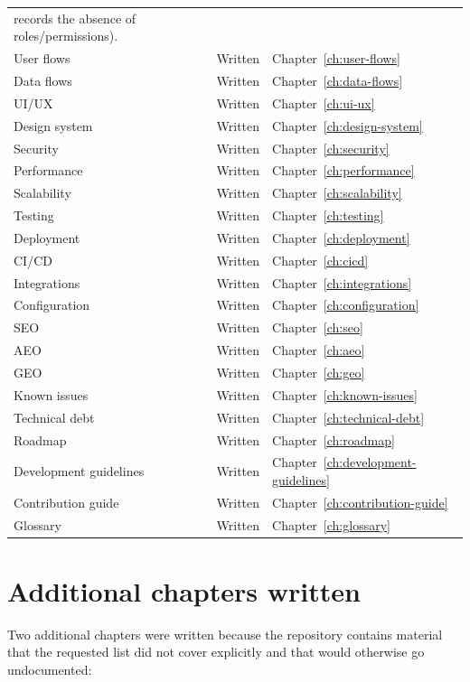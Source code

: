 \begin{longtable}{p{4.6cm}p{2.7cm}p{7.1cm}}
records the absence of roles/permissions). \\
User flows & Written & Chapter~\ref{ch:user-flows} \\
Data flows & Written & Chapter~\ref{ch:data-flows} \\
UI/UX & Written & Chapter~\ref{ch:ui-ux} \\
Design system & Written & Chapter~\ref{ch:design-system} \\
Security & Written & Chapter~\ref{ch:security} \\
Performance & Written & Chapter~\ref{ch:performance} \\
Scalability & Written & Chapter~\ref{ch:scalability} \\
Testing & Written & Chapter~\ref{ch:testing} \\
Deployment & Written & Chapter~\ref{ch:deployment} \\
CI/CD & Written & Chapter~\ref{ch:cicd} \\
Integrations & Written & Chapter~\ref{ch:integrations} \\
Configuration & Written & Chapter~\ref{ch:configuration} \\
SEO & Written & Chapter~\ref{ch:seo} \\
AEO & Written & Chapter~\ref{ch:aeo} \\
GEO & Written & Chapter~\ref{ch:geo} \\
Known issues & Written & Chapter~\ref{ch:known-issues} \\
Technical debt & Written & Chapter~\ref{ch:technical-debt} \\
Roadmap & Written & Chapter~\ref{ch:roadmap} \\
Development guidelines & Written & Chapter~\ref{ch:development-guidelines} \\
Contribution guide & Written & Chapter~\ref{ch:contribution-guide} \\
Glossary & Written & Chapter~\ref{ch:glossary} \\
\bottomrule
\end{longtable}

\section{Additional chapters written}

Two additional chapters were written because the repository contains material
that the requested list did not cover explicitly and that would otherwise go
undocumented:

